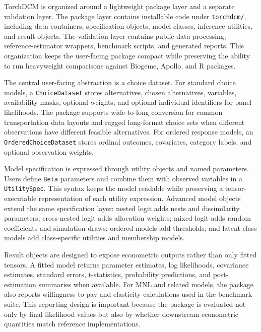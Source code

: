 TorchDCM is organized around a lightweight package layer and a separate validation layer.
The package layer contains installable code under \texttt{torchdcm/}, including data containers, specification objects, model classes, inference utilities, and result objects.
The validation layer contains public data processing, reference-estimator wrappers, benchmark scripts, and generated reports.
This organization keeps the user-facing package compact while preserving the ability to run heavyweight comparisons against Biogeme, Apollo, and R packages.

The central user-facing abstraction is a choice dataset.
For standard choice models, a \texttt{ChoiceDataset} stores alternatives, chosen alternatives, variables, availability masks, optional weights, and optional individual identifiers for panel likelihoods.
The package supports wide-to-long conversion for common transportation data layouts and ragged long-format choice sets when different observations have different feasible alternatives.
For ordered response models, an \texttt{OrderedChoiceDataset} stores ordinal outcomes, covariates, category labels, and optional observation weights.

Model specification is expressed through utility objects and named parameters.
Users define \texttt{Beta} parameters and combine them with observed variables in a \texttt{UtilitySpec}.
This syntax keeps the model readable while preserving a tensor-executable representation of each utility expression.
Advanced model objects extend the same specification layer: nested logit adds nests and dissimilarity parameters; cross-nested logit adds allocation weights; mixed logit adds random coefficients and simulation draws; ordered models add thresholds; and latent class models add class-specific utilities and membership models.

Result objects are designed to expose econometric outputs rather than only fitted tensors.
A fitted model returns parameter estimates, log likelihoods, covariance estimates, standard errors, t-statistics, probability predictions, and post-estimation summaries when available.
For MNL and related models, the package also reports willingness-to-pay and elasticity calculations used in the benchmark suite.
This reporting design is important because the package is evaluated not only by final likelihood values but also by whether downstream econometric quantities match reference implementations.
